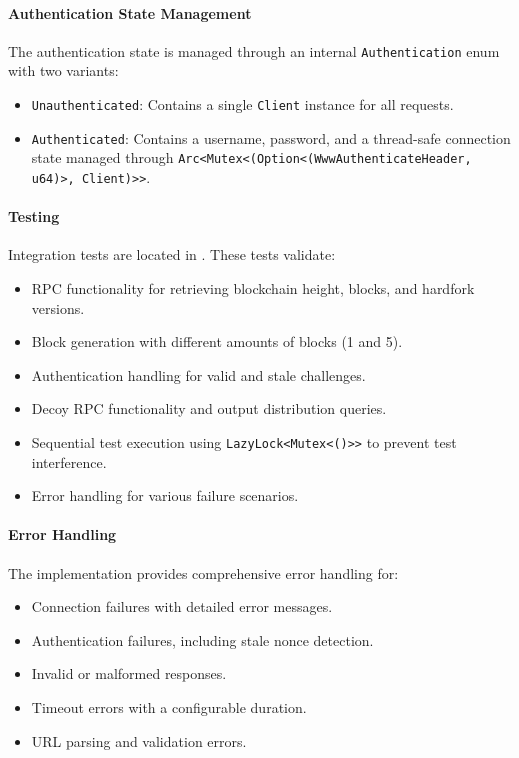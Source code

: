 \paragraph{Authentication State Management}
The authentication state is managed through an internal \texttt{Authentication} enum with two variants:
\begin{itemize}
    \item \texttt{Unauthenticated}: Contains a single \texttt{Client} instance for all requests.  
    \item \texttt{Authenticated}: Contains a username, password, and a thread-safe connection state managed through \texttt{Arc<Mutex<(Option<(WwwAuthenticateHeader, u64)>, Client)>>}.
\end{itemize}

\paragraph{Testing}
Integration tests are located in .  These tests validate:
\begin{itemize}
    \item RPC functionality for retrieving blockchain height, blocks, and hardfork versions.  
    \item Block generation with different amounts of blocks (1 and 5).  
    \item Authentication handling for valid and stale challenges.  
    \item Decoy RPC functionality and output distribution queries.  
    \item Sequential test execution using \texttt{LazyLock<Mutex<()>>} to prevent test interference.  
    \item Error handling for various failure scenarios.
\end{itemize}

\paragraph{Error Handling}
The implementation provides comprehensive error handling for:
\begin{itemize}
    \item Connection failures with detailed error messages.  
    \item Authentication failures, including stale nonce detection.  
    \item Invalid or malformed responses.  
    \item Timeout errors with a configurable duration.  
    \item URL parsing and validation errors.
\end{itemize}

